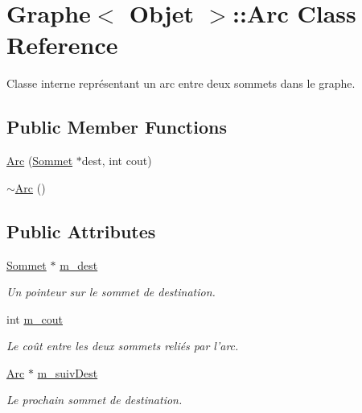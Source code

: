 \hypertarget{class_graphe_1_1_arc}{
\section{Graphe$<$ Objet $>$::Arc Class Reference}
\label{class_graphe_1_1_arc}
}


Classe interne représentant un arc entre deux sommets dans le graphe.  


\subsection*{Public Member Functions}
\begin{DoxyCompactItemize}
\item 
\hyperlink{class_graphe_1_1_arc_a3b485959423829dcc2ba7f5c1092a456}{Arc} (\hyperlink{class_graphe_1_1_sommet}{Sommet} $\ast$dest, int cout)
\item 
\hyperlink{class_graphe_1_1_arc_a775ea7fc101c2f8a45419f5a3be58166}{$\sim$Arc} ()
\end{DoxyCompactItemize}
\subsection*{Public Attributes}
\begin{DoxyCompactItemize}
\item 
\hyperlink{class_graphe_1_1_sommet}{Sommet} $\ast$ \hyperlink{class_graphe_1_1_arc_a9d1f11eb639df5e712b859b95d8c6d15}{m\_\-dest}
\begin{DoxyCompactList}\small\item\em Un pointeur sur le sommet de destination. \end{DoxyCompactList}\item 
int \hyperlink{class_graphe_1_1_arc_a7db3231570655fd43acc6be1a228b74c}{m\_\-cout}
\begin{DoxyCompactList}\small\item\em Le coût entre les deux sommets reliés par l'arc. \end{DoxyCompactList}\item 
\hyperlink{class_graphe_1_1_arc}{Arc} $\ast$ \hyperlink{class_graphe_1_1_arc_a48a25d83dfc9f2230050c40939a1cbe9}{m\_\-suivDest}
\begin{DoxyCompactList}\small\item\em Le prochain sommet de destination. \end{DoxyCompactList}\end{DoxyCompactItemize}



